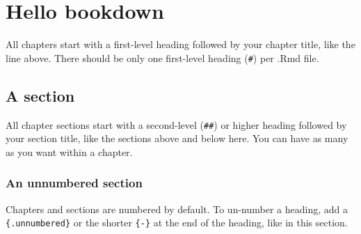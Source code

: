 \documentclass[
]{book}
\theoremstyle{definition}
\theoremstyle{definition}
\theoremstyle{definition}
\theoremstyle{definition}
\theoremstyle{remark}
\begin{document}
\hypertarget{hello-bookdown}{%
\chapter{Hello bookdown}\label{hello-bookdown}}

All chapters start with a first-level heading followed by your chapter title, like the line above. There should be only one first-level heading (\texttt{\#}) per .Rmd file.

\hypertarget{a-section}{%
\section{A section}\label{a-section}}

All chapter sections start with a second-level (\texttt{\#\#}) or higher heading followed by your section title, like the sections above and below here. You can have as many as you want within a chapter.

\hypertarget{an-unnumbered-section}{%
\subsection*{An unnumbered section}\label{an-unnumbered-section}}

Chapters and sections are numbered by default. To un-number a heading, add a \texttt{\{.unnumbered\}} or the shorter \texttt{\{-\}} at the end of the heading, like in this section.

  
\end{document}
